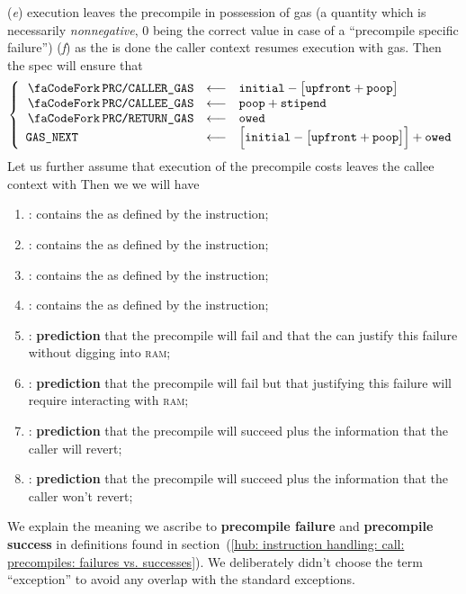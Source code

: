 (\emph{e}) execution leaves the precompile in possession of \hereOwed{} gas (a quantity which is necessarily \emph{nonnegative}, $0$ being the correct value in case of a ``precompile specific failure'') 
(\emph{f}) as the  is done the caller context resumes execution with \gasNext{} gas.
Then the spec will ensure that
\[
	\left\{ \begin{array}{lcl}
		\scenPrcCurrentlyValidCallerGas      & \longleftarrow & \hereInitial - \big[ \hereUpfront + \herePoop \big]                                \\
		\scenPrcGasAllowance                 & \longleftarrow & \herePoop + \hereStipend                                                           \\
		\scenPrcGasOwedToCaller              & \longleftarrow & \hereOwed{}                                                                        \\
		\gasNext                             & \longleftarrow & \Big[ \hereInitial - \big[ \hereUpfront + \herePoop \big] \Big] + \hereOwed{}      \\
	\end{array} \right.
\]
Let us further assume that execution of the precompile costs leaves the callee context with \hereOwed{}
Then we we will have 
\begin{enumerate}[resume]
	\item \scenPrcCdo:
		contains the \CDO{} as defined by the  instruction;
	\item \scenPrcCds:
		contains the \CDS{} as defined by the  instruction;
	\item \scenPrcRao:
		contains the \RAO{} as defined by the  instruction;
	\item \scenPrcRac:
		contains the \RAC{} as defined by the  instruction;
	\item \scenPrcFailureKnownToHub:
		\textbf{prediction} that the precompile will fail and that the \hubMod{} can justify this failure without digging into \textsc{ram}; 
	\item \scenPrcFailureKnownToRam:
		\textbf{prediction} that the precompile will fail but that justifying this failure will require interacting with \textsc{ram};
	\item \scenPrcSuccessWillRevert:
		\textbf{prediction} that the precompile will succeed plus the information that the caller will revert;
	\item \scenPrcSuccessWontRevert:
		\textbf{prediction} that the precompile will succeed plus the information that the caller won't revert;
\end{enumerate}
\saNote{} We explain the meaning we ascribe to \textbf{precompile failure} and \textbf{precompile success} in definitions found in section~(\ref{hub: instruction handling: call: precompiles: failures vs. successes}).
We deliberately didn't choose the term ``exception'' to avoid any overlap with the standard \evm{} exceptions. 
